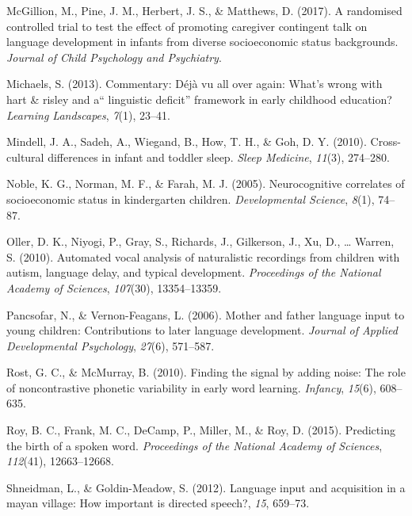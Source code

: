 \documentclass[man]{apa6}
\theoremstyle{definition}
\theoremstyle{definition}
\theoremstyle{definition}
\theoremstyle{remark}
\begin{document}
\hypertarget{ref-mcgillion2017randomised}{}
McGillion, M., Pine, J. M., Herbert, J. S., \& Matthews, D. (2017). A
randomised controlled trial to test the effect of promoting caregiver
contingent talk on language development in infants from diverse
socioeconomic status backgrounds. \emph{Journal of Child Psychology and
Psychiatry}.

\hypertarget{ref-michaels2013commentary}{}
Michaels, S. (2013). Commentary: Déjà vu all over again: What's wrong
with hart \& risley and a`` linguistic deficit'' framework in early
childhood education? \emph{Learning Landscapes}, \emph{7}(1), 23--41.

\hypertarget{ref-mindell2010cross}{}
Mindell, J. A., Sadeh, A., Wiegand, B., How, T. H., \& Goh, D. Y.
(2010). Cross-cultural differences in infant and toddler sleep.
\emph{Sleep Medicine}, \emph{11}(3), 274--280.

\hypertarget{ref-noble2005neurocognitive}{}
Noble, K. G., Norman, M. F., \& Farah, M. J. (2005). Neurocognitive
correlates of socioeconomic status in kindergarten children.
\emph{Developmental Science}, \emph{8}(1), 74--87.

\hypertarget{ref-oller2010automated}{}
Oller, D. K., Niyogi, P., Gray, S., Richards, J., Gilkerson, J., Xu, D.,
\ldots{} Warren, S. (2010). Automated vocal analysis of naturalistic
recordings from children with autism, language delay, and typical
development. \emph{Proceedings of the National Academy of Sciences},
\emph{107}(30), 13354--13359.

\hypertarget{ref-pancsofar2006mother}{}
Pancsofar, N., \& Vernon-Feagans, L. (2006). Mother and father language
input to young children: Contributions to later language development.
\emph{Journal of Applied Developmental Psychology}, \emph{27}(6),
571--587.

\hypertarget{ref-rost2010finding}{}
Rost, G. C., \& McMurray, B. (2010). Finding the signal by adding noise:
The role of noncontrastive phonetic variability in early word learning.
\emph{Infancy}, \emph{15}(6), 608--635.

\hypertarget{ref-roy2015predicting}{}
Roy, B. C., Frank, M. C., DeCamp, P., Miller, M., \& Roy, D. (2015).
Predicting the birth of a spoken word. \emph{Proceedings of the National
Academy of Sciences}, \emph{112}(41), 12663--12668.

\hypertarget{ref-shneidman2012language}{}
Shneidman, L., \& Goldin-Meadow, S. (2012). Language input and
acquisition in a mayan village: How important is directed speech?,
\emph{15}, 659--73.
\end{document}
